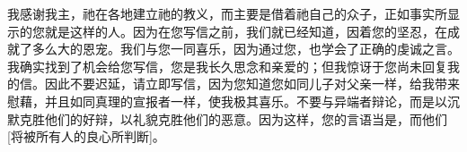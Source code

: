 我感谢我主，祂在各地建立祂的教义，而主要是借着祂自己的众子，正如事实所显示的您就是这样的人。因为在您写信之前，我们就已经知道，因着您的坚忍，在成就了多么大的恩宠。我们与您一同喜乐，因为通过您，也学会了正确的虔诚之言。我确实找到了机会给您写信，您是我长久思念和亲爱的；但我惊讶于您尚未回复我的信。因此不要迟延，请立即写信，因为您知道您如同儿子对父亲一样，给我带来慰藉，并且如同真理的宣报者一样，使我极其喜乐。不要与异端者辩论，而是以沉默克胜他们的好辩，以礼貌克胜他们的恶意。因为这样，您的言语当是，而他们[将被所有人的良心所判断]。\par


